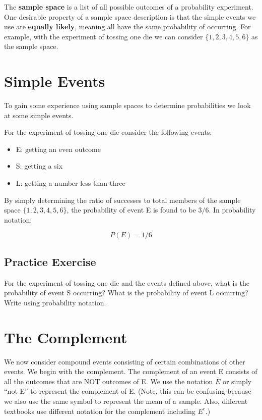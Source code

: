 \documentclass[]{book}
\providecommand{\tightlist}{%
  \setlength{\itemsep}{0pt}\setlength{\parskip}{0pt}}
\theoremstyle{definition}
\theoremstyle{definition}
\theoremstyle{definition}
\theoremstyle{remark}
\begin{document}
The \textbf{sample space} is a list of all possible outcomes of a
probability experiment. One desirable property of a sample space
description is that the simple events we use are \textbf{equally
likely}, meaning all have the same probability of occurring. For
example, with the experiment of tossing one die we can consider
\(\{1,2,3,4,5,6\}\) as the sample space.

\section{Simple Events}\label{simple_events}

To gain some experience using sample spaces to determine probabilities
we look at some simple events.

For the experiment of tossing one die consider the following events:

\begin{itemize}
\tightlist
\item
  E: getting an even outcome
\item
  S: getting a six
\item
  L: getting a number less than three
\end{itemize}

By simply determining the ratio of successes to total members of the
sample space \(\{1,2,3,4,5,6\}\), the probability of event E is found to
be \(3/6\). In probability notation:

\[P(E) = 1/6\]

\subsection{Practice Exercise}\label{practice-exercise}

For the experiment of tossing one die and the events defined above, what
is the probability of event S occurring? What is the probability of
event L occurring? Write using probability notation.

\section{The Complement}\label{the_complement}

We now consider compound events consisting of certain combinations of
other events. We begin with the complement. The complement of an event E
consists of all the outcomes that are NOT outcomes of E. We use the
notation \(\bar{E}\) or simply ``not E'' to represent the complement of
E. (Note, this can be confusing because we also use the same symbol to
represent the mean of a sample. Also, different textbooks use different
notation for the complement including \(E^c\).)
\end{document}
